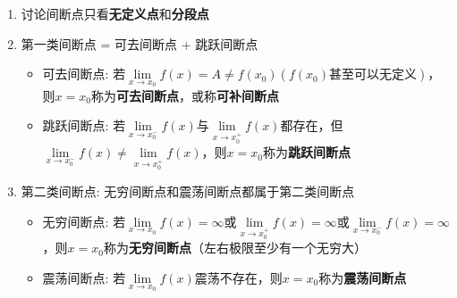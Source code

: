 \documentclass[../book.tex]{subfiles}
\begin{document}
    \begin{enumerate}
        \item 讨论间断点只看\textbf{无定义点}和\textbf{分段点}
        \item 第一类间断点 = 可去间断点 + 跳跃间断点
        \begin{itemize}
            \item 可去间断点: 若$\lim\limits_{x\to x_0} f(x) = A \neq f(x_0)(f(x_0)\text{甚至可以无定义})$，则$x = x_0$称为\textbf{可去间断点}，或称\textbf{可补间断点}
            \item 跳跃间断点: 若$\lim\limits_{x\to x_0^-}f(x)$与$\lim\limits_{x\to x_0^+}f(x)$都存在，但$\lim\limits_{x\to x_0^-}f(x) \neq \lim\limits_{x\to x_0^+}f(x)$，则$x = x_0$称为\textbf{跳跃间断点}
        \end{itemize}
        \item 第二类间断点: 无穷间断点和震荡间断点都属于第二类间断点
        \begin{itemize}
            \item 无穷间断点: 若$\lim\limits_{x\to x_0}f(x) = \infty$或$\lim\limits_{x\to x_0^+}f(x) = \infty$或$\lim\limits_{x\to x_0^-}f(x) = \infty$，则$x = x_0$称为\textbf{无穷间断点}（左右极限至少有一个无穷大）
            \item 震荡间断点: 若$\lim\limits_{x\to x_0}f(x)$震荡不存在，则$x = x_0$称为\textbf{震荡间断点}
        \end{itemize}
    \end{enumerate}
\end{document}
